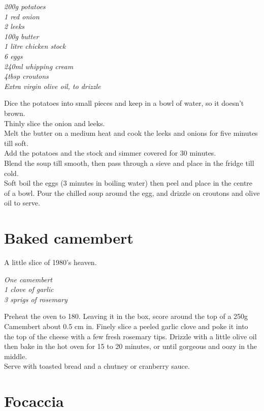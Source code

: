 \documentclass{tufte-book}
\begin{document}
\smallskip
\emph{200g potatoes
\\1 red onion
\\2 leeks
\\100g butter
\\1 litre chicken stock
\\6 eggs
\\240ml whipping cream
\\4tbsp croutons
\\Extra virgin olive oil, to drizzle}

\smallskip
Dice the potatoes into small pieces and keep in a bowl of water, so it doesn't brown.
\\Thinly slice the onion and leeks. 
\\Melt the butter on a medium heat and cook the leeks and onions for five minutes till soft.
\\Add the potatoes and the stock and simmer covered for 30 minutes.
\\Blend the soup till smooth, then pass through a sieve and place in the fridge till cold.
\\Soft boil the eggs (3 minutes in boiling water) then peel and place in the centre of a bowl. Pour the chilled soup around the egg, and drizzle on croutons and olive oil to serve.

\section{Baked camembert}

A little slice of 1980's heaven. 

\smallskip
\emph{One camembert
\\1 clove of garlic
\\3 sprigs of rosemary}

\smallskip
Preheat the oven to 180\celsius. Leaving it in the box, score around the top of a 250g Camembert about 0.5 cm in. Finely slice a peeled garlic clove and poke it into the top of the cheese with a few fresh rosemary tips. Drizzle with a little olive oil then bake in the hot oven for 15 to 20 minutes, or until gorgeous and oozy in the middle. 
\\Serve with toasted bread and a chutney or cranberry sauce.

\section{Focaccia}
\end{document}
